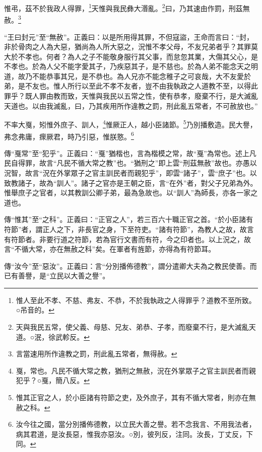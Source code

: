 惟弔，茲不於我政人得罪，\footnote{惟人至此不孝、不慈、弗友、不恭，不於我執政之人得罪乎？道教不至所致。○吊音的。}天惟與我民彝大湣亂。\footnote{天與我民五常，使父義、母慈、兄友、弟恭、子孝，而廢棄不行，是大滅亂天道。○泯，徐武軫反。}曰，乃其速由作罰，刑茲無赦。\footnote{言當速用所作違教之罰，刑此亂五常者，無得赦。}

{\noindent\shu{}\fzkt “王曰封元”至“無赦”。正義曰：以是所用得其罪，不但寇盜，王命而言曰：“封，非於骨肉之人為大惡，猶尚為人所大惡之，況惟不孝父母，不友兄弟者乎？其罪莫大於不孝也。何者？為人之子不能敬身服行其父事，而怠忽其業，大傷其父心，是不孝也。於為人父不能字愛其子，乃疾惡其子，是不慈也。於為人弟不能念天之明道，故乃不能恭事其兄，是不恭也。為人兄亦不能念稚子之可哀哉，大不友愛於弟，是不友也。惟人所行以至此不孝不友者，豈不由我執政之人道教不至，以得此罪乎？既人罪由教而致，天惟與我民以五常之性，使有恭孝，廢棄不行，是大滅亂天道也。以由我滅亂，曰，乃其疾用所作違教之罰，刑此亂五常者，不可赦放也。” \par}

不率大戛，矧惟外庶子、訓人，\footnote{戛，常也。凡民不循大常之教，猶刑之無赦，況在外掌眾子之官主訓民者而親犯乎？○戛，簡八反。}惟厥正人，越小臣諸節。\footnote{惟其正官之人，於小臣諸有符節之吏，及外庶子，其有不循大常者，則亦在無赦之科。}乃別播敷造。民大譽，弗念弗庸，瘝厥君，時乃引惡，惟朕憝。\footnote{汝今往之國，當分別播佈德教，以立民大善之譽。若不念我言、不用我法者，病其君道，是汝長惡，惟我亦惡汝。○別，彼列反，注同。汝長，丁丈反，下同。}


{\noindent\zhuan{}\fzbyks 傳“戛常”至“犯乎”。正義曰：“戛”猶楷也，言為楷模之常，故“戛”為常也。述上凡民自得罪，故言“凡民不循大常之教”也。“猶刑之”即上雲“刑茲無赦”故也。亦愚以況智，故言“況在外掌眾子之官主訓民者而親犯乎”，即雲“諸子”，雲“庶子”也。以致教諸子，故為“訓人”。諸子之官亦是王朝之臣，言“在外”者，對父子兄弟為外。惟舉庶子之官者，以其教訓公卿子弟，最為急故也。以“訓人”為師長，亦各一家之道也。 \par}

{\noindent\zhuan{}\fzbyks 傳“惟其”至“之科”。正義曰：“正官之人”，若三百六十職正官之首。“於小臣諸有符節”者，謂正人之下，非長官之身，下至符吏。“諸有符節”，為教人之故，故言有符節者。非要行道之符節，若為官行文書而有符，今之印者也。以上況之，故言“不循大常，亦在無赦之科”矣。在軍者有旌節，亦得為有符節耳。 \par}

{\noindent\zhuan{}\fzbyks 傳“汝今”至“惡汝”。正義曰：言“分別播佈德教”，謂分遣卿大夫為之教民使善。而已有善譽，是“立民以大善之譽”。 \par}

